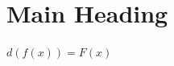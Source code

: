 \documentclass{article}
\begin{document}
\section{Main Heading}

$d(f(x))=F(x)$

%
%
\end{document}
